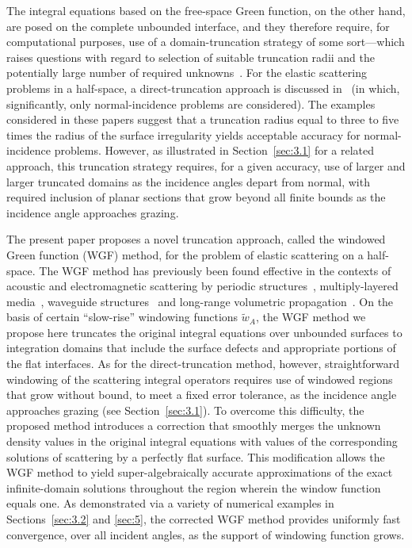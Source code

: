 \documentclass[10pt]{article}
\numberwithin{equation}{section}
\begin{document}
The integral equations based on the free-space Green function, on the
other hand, are posed on the complete unbounded interface, and they
therefore require, for computational purposes, use of a
domain-truncation strategy of some sort---which raises questions with
regard to selection of suitable truncation radii and the potentially
large number of required unknowns~\cite{AA04,CB13}. For the elastic
scattering problems in a half-space, a direct-truncation approach is
discussed in~\cite{CBS08,CB13,GCBS12} (in which, significantly, only
normal-incidence problems are considered). The examples considered in
these papers suggest that a truncation radius equal to three to five
times the radius of the surface irregularity yields acceptable
accuracy for normal-incidence problems.  However, as illustrated in
Section~\ref{sec:3.1} for a related approach, this truncation strategy
requires, for a given accuracy, use of larger and larger truncated
domains as the incidence angles depart from normal, with required
inclusion of planar sections that grow beyond all finite bounds as the
incidence angle approaches grazing.

The present paper proposes a novel truncation approach, called the
windowed Green function (WGF) method, for the problem of elastic
scattering on a half-space. The WGF method has previously been found
effective in the contexts of acoustic and electromagnetic scattering
by periodic structures~\cite{BD14,BSTV16,M07}, multiply-layered
media~\cite{BLPT16,BP17,P16}, waveguide structures~\cite{BGP17} and
long-range volumetric propagation~\cite{CBA09}. On the basis of
certain ``slow-rise'' windowing functions $\widetilde{w}_A$, the WGF
method we propose here truncates the original integral equations over
unbounded surfaces to integration domains that include the surface
defects and appropriate portions of the flat interfaces. As for the
direct-truncation method, however, straightforward windowing of the
scattering integral operators requires use of windowed regions that
grow without bound, to meet a fixed error tolerance, as the incidence
angle approaches grazing (see Section~\ref{sec:3.1}). To overcome this
difficulty, the proposed method introduces a correction that smoothly
merges the unknown density values in the original integral equations
with values of the corresponding solutions of scattering by a
perfectly flat surface. This modification allows the WGF method to
yield super-algebraically accurate approximations of the exact
infinite-domain solutions throughout the region wherein the window
function equals one. As demonstrated via a variety of numerical
examples in Sections~\ref{sec:3.2} and \ref{sec:5}, the corrected WGF
method provides uniformly fast convergence, over all incident angles,
as the support of windowing function grows.
\end{document}
